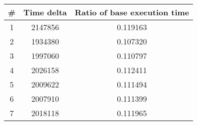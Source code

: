 \begin{tabular}{ccc}
\toprule
# & Time delta & Ratio of base execution time\\
\midrule
1 & 2147856 & 0.119163 \\
2 & 1934380 & 0.107320 \\
3 & 1997060 & 0.110797 \\
4 & 2026158 & 0.112411 \\
5 & 2009622 & 0.111494 \\
6 & 2007910 & 0.111399 \\
7 & 2018118 & 0.111965 \\
\bottomrule
\end{tabular}